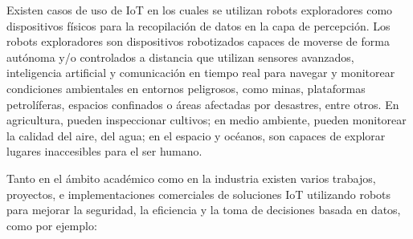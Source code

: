 Existen casos de uso de IoT en los cuales se utilizan robots exploradores como dispositivos físicos para la recopilación de datos en la capa de percepción. Los robots exploradores son dispositivos robotizados capaces de moverse de forma autónoma y/o controlados a distancia que utilizan sensores avanzados, inteligencia artificial y comunicación en tiempo real para navegar y monitorear condiciones ambientales en entornos peligrosos, como minas, plataformas petrolíferas, espacios confinados o áreas afectadas por desastres, entre otros. En agricultura, pueden inspeccionar cultivos; en medio ambiente, pueden monitorear la calidad del aire, del agua; en el espacio y océanos, son capaces de explorar lugares inaccesibles para el ser humano. 


Tanto en el ámbito académico como en la industria existen varios trabajos, proyectos, e implementaciones comerciales de soluciones IoT utilizando robots para mejorar la seguridad, la eficiencia y la toma de decisiones basada en datos, como por ejemplo: 

